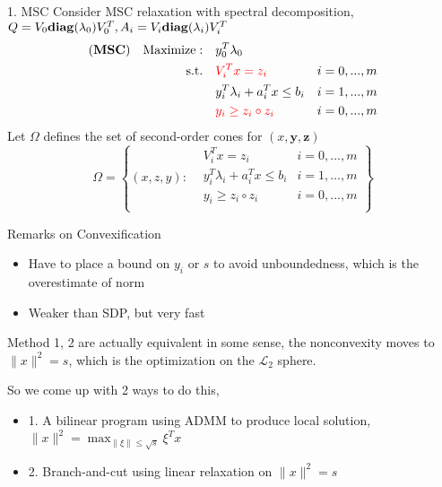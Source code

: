 \begin{frame}{1. MSC}
  Consider MSC relaxation with spectral decomposition, \(Q =V_0 \mathbf{diag} (\lambda_0) V_0^T, A_i = V_i \mathbf{diag} (\lambda_i) V_i^T\)
  \begin{equation}\label{eq.rel.msc}
    \begin{aligned}
      (\textbf{MSC}) \quad \mathrm{Maximize: }\quad & y_0 ^T\lambda_0                                      \\
      \mathrm{s.t.} \quad                        & \textcolor{red}{ V_i^Tx = z_i}           & i=0,...,m \\
                                                 & y_i ^T\lambda_i  + a_i^Tx  \le b_i       & i=1,...,m \\
                                                 & \textcolor{red}{y_i \ge z_i \circ z_i  } & i=0,...,m
    \end{aligned}
  \end{equation}
  Let \(\Omega\) defines the set of second-order cones for \((x, \bm y, \bm z)\)
  \begin{equation}
    \Omega = \left\{ (x,z,y) :  \begin{aligned}
       & V_i^Tx = z_i                       & i=0,...,m \\
       & y_i ^T\lambda_i  + a_i^Tx  \le b_i & i=1,...,m \\
       & y_i \ge z_i \circ z_i              & i=0,...,m \\
    \end{aligned}\right\}
  \end{equation}
\end{frame}
\begin{frame}{Remarks on Convexification}
  \begin{itemize}
    \item Have to place a bound on \(y_i\) or \(s\) to avoid unboundedness, which is the overestimate of norm
    \item Weaker than SDP, but very fast
  \end{itemize}

  Method  1, 2 are actually equivalent in some sense, the nonconvexity moves to \(\|x\|^2= s\), which is the optimization on the \(\mathscr{L}_2\) sphere.

  So we come up with 2 ways to do this,

  \begin{itemize}
    \item 1. A bilinear program using ADMM to produce local solution, \(\|x\|^2 = \max_{\|\xi\| \le \sqrt s} \xi^T x\)
    \item 2. Branch-and-cut using linear relaxation on \(\|x\|^2= s\)
  \end{itemize}
\end{frame}

